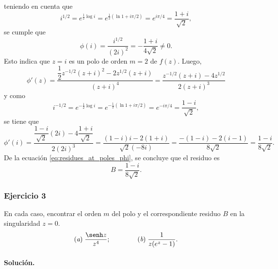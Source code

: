 \documentclass[a4paper]{report}
\begin{document}
\begin{enumerate}
 teniendo en cuenta que 
 \[
  i^{1/2}=e^{\frac{1}{2}\log i}=e^{\frac{1}{2}(\ln1+i\pi/2)}=e^{i\pi/4}=\frac{1+i}{\sqrt{2}},
 \]
 se cumple que 
 \[
  \phi(i)=\frac{i^{1/2}}{(2i)^2}=-\frac{1+i}{4\sqrt{2}}\neq0.
 \]
 Esto indica que \(z=i\) es un polo de orden \(m=2\) de \(f(z)\). Luego,
 \[
  \phi'(z)=\frac{\dfrac{1}{2}z^{-1/2}(z+i)^2-2z^{1/2}(z+i)}{(z+i)^4}
    =\frac{z^{-1/2}(z+i)-4z^{1/2}}{2(z+i)^3}
 \]
 y como
 \[
  i^{-1/2}=e^{-\frac{1}{2}\log i}=e^{-\frac{1}{2}(\ln1+i\pi/2)}=e^{-i\pi/4}=\frac{1-i}{\sqrt{2}},
 \]
 se tiene que 
 \[
  \phi'(i)=\frac{\dfrac{1-i}{\sqrt{2}}(2i)-4\dfrac{1+i}{\sqrt{2}}}{2(2i)^3}
    =\frac{(1-i)i-2(1+i)}{\sqrt{2}(-8i)}=\frac{-(1-i)-2(i-1)}{8\sqrt{2}}
    =\frac{1-i}{8\sqrt{2}}.
 \]
 De la ecuación \ref{eq:residues_at_poles_phi}, se concluye que el residuo es
 \[
  B=\frac{1-i}{8\sqrt{2}}.
 \]
\end{enumerate}

\subsubsection*{Ejercicio 3}

En cada caso, encontrar el orden \(m\) del polo y el correspondiente residuo \(B\) en la singularidad \(z=0\).
\[
 (\textit{a})\;\frac{\senh z}{z^4};\qquad\qquad (\textit{b})\;\frac{1}{z(e^z-1)}.
\]

\paragraph{Solución.}
\end{document}
